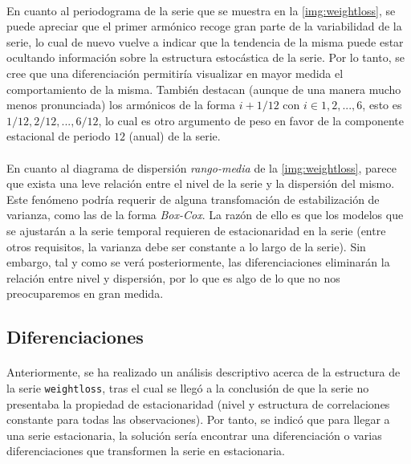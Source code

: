\documentclass[a4paper, spanish]{article}
\begin{document}
      \paragraph{}
      En cuanto al periodograma de la serie que se muestra en la \autoref{img:weightloss}, se puede apreciar que el primer armónico recoge gran parte de la variabilidad de la serie, lo cual de nuevo vuelve a indicar que la tendencia de la misma puede estar ocultando información sobre la estructura estocástica de la serie. Por lo tanto, se cree que una diferenciación permitiría visualizar en mayor medida el comportamiento de la misma. También destacan (aunque de una manera mucho menos pronunciada) los armónicos de la forma $i + 1 / 12$ con $i \in {1, 2, ..., 6}$, esto es $1/12, 2/12, ..., 6/12$, lo cual es otro argumento de peso en favor de la componente estacional de periodo $12$ (anual) de la serie.

      \paragraph{}
      En cuanto al diagrama de dispersión \emph{rango-media} de la \autoref{img:weightloss}, parece que exista una leve relación entre el nivel de la serie y la dispersión del mismo. Este fenómeno podría requerir de alguna transfomación de estabilización de varianza, como las de la forma \emph{Box-Cox}. La razón de ello es que los modelos que se ajustarán a la serie temporal requieren de estacionaridad en la serie (entre otros requisitos, la varianza debe ser constante a lo largo de la serie). Sin embargo, tal y como se verá posteriormente, las diferenciaciones eliminarán la relación entre nivel y dispersión, por lo que es algo de lo que no nos preocuparemos en gran medida.


    \subsection{Diferenciaciones}
    \label{sec:differences}

      \paragraph{}
      Anteriormente, se ha realizado un análisis descriptivo acerca de la estructura de la serie \texttt{weightloss}, tras el cual se llegó a la conclusión de que la serie no presentaba la propiedad de estacionaridad (nivel y estructura de correlaciones constante para todas las observaciones). Por tanto, se indicó que para llegar a una serie estacionaria, la solución sería encontrar una diferenciación o varias diferenciaciones que transformen la serie en estacionaria.
\end{document}
